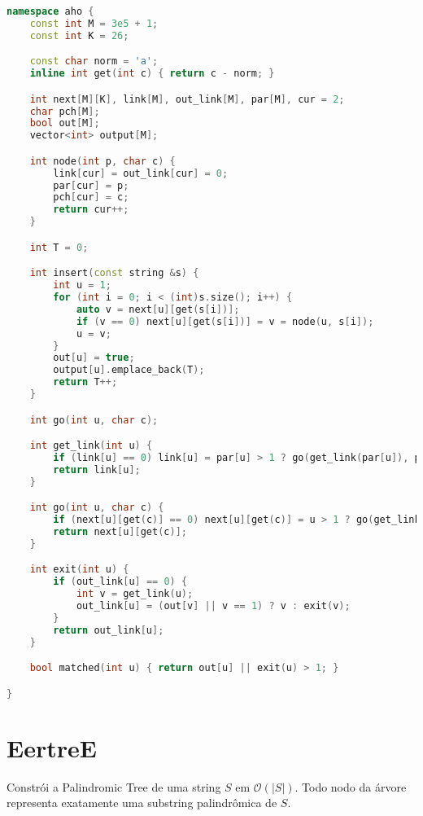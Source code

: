 \documentclass[10pt, a4paper, oneside]{book}
\begin{document}
\begin{lstlisting}[language=C++]
namespace aho {
    const int M = 3e5 + 1;
    const int K = 26;

    const char norm = 'a';
    inline int get(int c) { return c - norm; }

    int next[M][K], link[M], out_link[M], par[M], cur = 2;
    char pch[M];
    bool out[M];
    vector<int> output[M];

    int node(int p, char c) {
        link[cur] = out_link[cur] = 0;
        par[cur] = p;
        pch[cur] = c;
        return cur++;
    }

    int T = 0;

    int insert(const string &s) {
        int u = 1;
        for (int i = 0; i < (int)s.size(); i++) {
            auto v = next[u][get(s[i])];
            if (v == 0) next[u][get(s[i])] = v = node(u, s[i]);
            u = v;
        }
        out[u] = true;
        output[u].emplace_back(T);
        return T++;
    }

    int go(int u, char c);

    int get_link(int u) {
        if (link[u] == 0) link[u] = par[u] > 1 ? go(get_link(par[u]), pch[u]) : 1;
        return link[u];
    }

    int go(int u, char c) {
        if (next[u][get(c)] == 0) next[u][get(c)] = u > 1 ? go(get_link(u), c) : 1;
        return next[u][get(c)];
    }

    int exit(int u) {
        if (out_link[u] == 0) {
            int v = get_link(u);
            out_link[u] = (out[v] || v == 1) ? v : exit(v);
        }
        return out_link[u];
    }

    bool matched(int u) { return out[u] || exit(u) > 1; }

}\end{lstlisting}
\hfill

\section{EertreE}


Constrói a Palindromic Tree de uma string $S$ em $\mathcal{O}(|S|)$. Todo nodo da árvore representa exatamente uma substring palindrômica de $S$.
\end{document}
